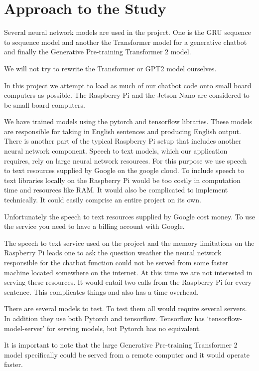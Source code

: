 \section{Approach to the Study}

Several neural network models are used in the project. One is the GRU sequence to sequence model and another the Transformer model for a generative chatbot and finally the Generative Pre-training Transformer 2 model.

We will not try to rewrite the Transformer or GPT2 model ourselves.

In this project we attempt to load as much of our chatbot code onto small board computers as possible. The Raspberry Pi and the Jetson Nano are considered to be small board computers.

We have trained models using the pytorch and tensorflow libraries. These models are responsible for taking in English sentences and producing English output. There is another part of the typical Raspberry Pi setup that includes another neural network component. Speech to text models, which our application requires, rely on large neural network resources. For this purpose we use speech to text resources supplied by Google on the google cloud. To include speech to text libraries locally on the Raspberry Pi would be too costly in computation time and resources like RAM. It would also be complicated to implement technically. It could easily comprise an entire project on its own.

Unfortunately the speech to text resources supplied by Google cost money. To use the service you need to have a billing account with Google.

The speech to text service used on the project and the memory limitations on the Raspberry Pi leads one to ask the question weather the neural network responsible for the chatbot function could not be served from some faster machine located somewhere on the internet. At this time we are not interested in serving these resources. It would entail two calls from the Raspberry Pi for every sentence. This complicates things and also has a time overhead. 

There are several models to test. To test them all would require several servers. In addition they use both Pytorch and tensorflow. Tensorflow has `tensorflow-model-server' for serving models, but Pytorch has no equivalent.

It is important to note that the large Generative Pre-training Transformer 2 model specifically could be served from a remote computer and it would operate faster. 

